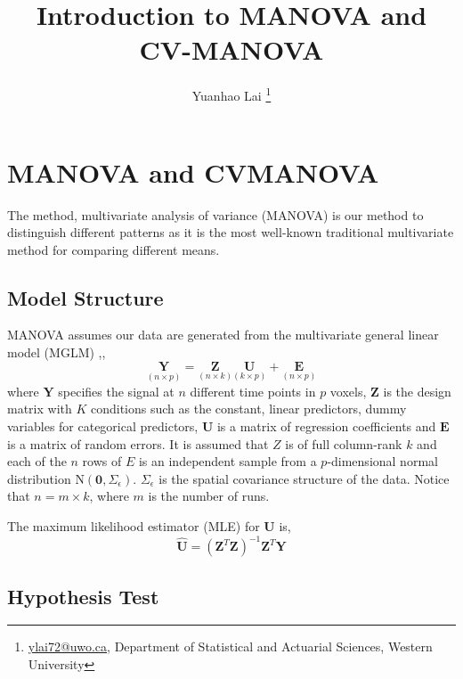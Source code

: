 \documentclass[english]{article}\usepackage[]{graphicx}\usepackage[]{color}
\begin{document}
\title{Introduction to MANOVA and CV-MANOVA}


\author{Yuanhao Lai%
\thanks{\protect\url{ylai72@uwo.ca}, Department of Statistical and Actuarial
Sciences, Western University%
}}

\maketitle
\vspace{-30bp}



\section{MANOVA and CVMANOVA}

The method, multivariate analysis of variance (MANOVA) is our method
to distinguish different patterns as it is the most well-known traditional
multivariate method for comparing different means\cite{davis2002statistical}.


\subsection{Model Structure}

MANOVA assumes our data are generated from the multivariate general
linear model (MGLM) \cite{fox2013hypothesis},, 
\[
\underset{\left(n\times p\right)}{\boldsymbol{Y}}=\underset{\left(n\times k\right)}{\boldsymbol{Z}}\underset{\left(k\times p\right)}{\boldsymbol{U}}+\underset{\left(n\times p\right)}{\boldsymbol{E}}
\]
where $\boldsymbol{Y}$ specifies the signal at $n$ different time
points in $p$ voxels, $\boldsymbol{Z}$ is the design matrix with
$K$ conditions such as the constant, linear predictors, dummy variables
for categorical predictors, $\boldsymbol{U}$ is a matrix of regression
coefficients and $\boldsymbol{E}$ is a matrix of random errors. It
is assumed that $Z$ is of full column-rank $k$ and each of the $n$
rows of $E$ is an independent sample from a $p$-dimensional normal
distribution $\text{N}(\boldsymbol{0},\Sigma_{\epsilon})$. $\Sigma_{\epsilon}$
is the spatial covariance structure of the data. Notice that $n=m\times k$,
where $m$ is the number of runs.

The maximum likelihood estimator (MLE) for $\boldsymbol{U}$ is, 
\[
\hat{\boldsymbol{U}}=\left(\boldsymbol{Z}^{T}\boldsymbol{Z}\right)^{-1}\boldsymbol{Z}^{T}\boldsymbol{Y}
\]



\subsection{Hypothesis Test}
\end{document}

